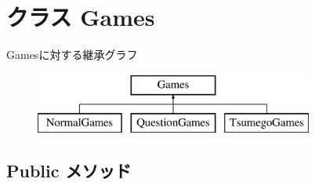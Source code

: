 \hypertarget{interface_games}{
\section{クラス Games}
\label{interface_games}
}
Gamesに対する継承グラフ\begin{figure}[H]
\begin{center}
\leavevmode
\includegraphics[height=2.000000cm]{interface_games}
\end{center}
\end{figure}
\subsection*{Public メソッド}
